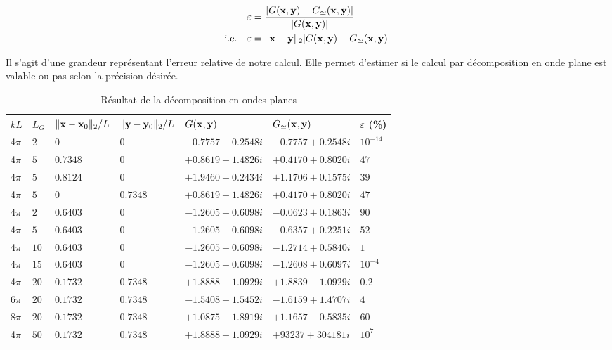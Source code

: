 \documentclass[10pt]{article}
\begin{document}
\begin{multicols}{2}
\begin{align}
 \varepsilon & = \frac{|G({\bf x}, {\bf y}) - G_{\simeq}({\bf x}, {\bf y})|}{|G({\bf x}, {\bf y})|} \\
 \text{i.e.} \quad \varepsilon & = \|{\bf x} -{\bf y}\|_{2}|G({\bf x}, {\bf y}) - G_{\simeq}({\bf x}, {\bf y})|
\end{align}


Il s'agit d'une grandeur représentant l'erreur relative de notre calcul. Elle permet d'estimer si le calcul par décomposition en onde plane est valable ou pas selon la précision désirée.


\end{multicols}


\begin{table}[H]
\centering
\begin{tabular}{m{1cm} m{0.5cm} | m{2cm} m{2cm} | m{3.5cm} m{3.5cm} | m{1cm}} 
   \hline
    $kL$ & $L_G$ & $\|{\bf x}-{\bf x}_0\|_{2}/L$ & $\|{\bf y}-{\bf y}_0\|_{2}/L$ & $G({\bf x}, {\bf y})$ & $G_{\simeq}({\bf x},{\bf y})$ & $\varepsilon$ (\%) \\
    \toprule
    \toprule
    4$\pi$ & $2$ & $0$ & $0$ & $-0.7757+0.2548i$ & $-0.7757+0.2548i$ & $10^{-14}$ \\ \hline
	4$\pi$ & $5$ & $0.7348$ & $0$ & $+0.8619+1.4826i$ & $+0.4170+0.8020i$ & $47$ \\
	4$\pi$ & $5$ & $0.8124$ & $0$ & $+1.9460+0.2434i$ & $+1.1706+0.1575i$ & $39$ \\
	4$\pi$ & $5$ & $0$ & $0.7348$ & $+0.8619+1.4826i$ & $+0.4170+0.8020i$ & $47$ \\ \hline
	4$\pi$ & $2$ & $0.6403$ & $0$ & $-1.2605+0.6098i$ & $-0.0623+0.1863i$ & $90$ \\
	4$\pi$ & $5$ & $0.6403$ & $0$ & $-1.2605+0.6098i$ & $-0.6357+0.2251i$ & $52$ \\
	4$\pi$ & $10$ & $0.6403$ & $0$ & $-1.2605+0.6098i$ & $-1.2714+0.5840i$ & $1$ \\
	4$\pi$ & $15$ & $0.6403$ & $0$ & $-1.2605+0.6098i$ & $-1.2608+0.6097i$ & $10^{-4}$\\ \hline 
	4$\pi$ & $20$ & $0.1732$ & $0.7348$ & $+1.8888-1.0929i$ & $+1.8839-1.0929i$ & $0.2$ \\
	6$\pi$ & $20$ & $0.1732$ & $0.7348$ & $-1.5408+1.5452i$ & $-1.6159+1.4707i$ & $4$ \\
	8$\pi$ & $20$ & $0.1732$ & $0.7348$ & $+1.0875-1.8919i$ & $+1.1657-0.5835i$ & $60$ \\ \hline
	4$\pi$ & $50$ & $0.1732$ & $0.7348$ & $+1.8888-1.0929i$ & $+93237+304181i$ & $10^{7}$ \\
    \hline
\end{tabular}
\caption{Résultat de la décomposition en ondes planes}
\label{tab:Q5}
\end{table}
\end{document}
